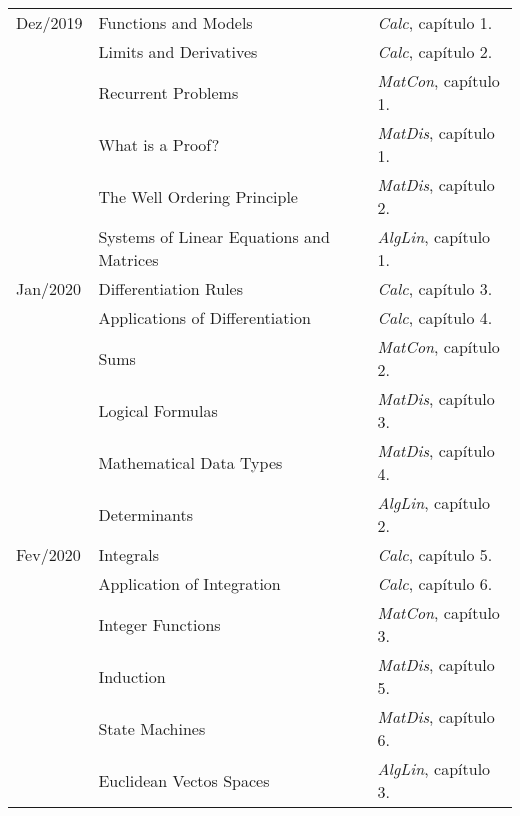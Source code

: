 \documentclass[a4paper]{inzane_syllabus} %
\begin{document}
\begin{center}
\begin{tabularx}{\textwidth}{p{2cm}p{8cm}p{9.5cm}}  
\arrayrulecolor{myCOLOR}\hline
\multicolumn{3}{l}{\textbf{\textcolor{myCOLOR}{\large MÓDULO 1: Base Matemática }}} \\
\hline
Dez/2019 & Functions and Models                      & \emph{Calc},   capítulo 1. \\
         & Limits and Derivatives                    & \emph{Calc},   capítulo 2. \\
         & Recurrent Problems                        & \emph{MatCon}, capítulo 1. \\
         & What is a Proof?                          & \emph{MatDis}, capítulo 1. \\
         & The Well Ordering Principle               & \emph{MatDis}, capítulo 2. \\
         & Systems of Linear Equations and Matrices  & \emph{AlgLin}, capítulo 1. \\

\arrayrulecolor{maingray}\hline
Jan/2020 & Differentiation Rules            & \emph{Calc},   capítulo 3. \\
         & Applications of Differentiation  & \emph{Calc},   capítulo 4. \\
         & Sums                             & \emph{MatCon}, capítulo 2. \\
         & Logical Formulas                 & \emph{MatDis}, capítulo 3. \\
         & Mathematical Data Types          & \emph{MatDis}, capítulo 4. \\
         & Determinants                     & \emph{AlgLin}, capítulo 2. \\

\arrayrulecolor{maingray}\hline
Fev/2020 & Integrals                   & \emph{Calc},   capítulo 5. \\
         & Application of Integration  & \emph{Calc},   capítulo 6. \\
         & Integer Functions           & \emph{MatCon}, capítulo 3. \\
         & Induction                   & \emph{MatDis}, capítulo 5. \\
         & State Machines              & \emph{MatDis}, capítulo 6. \\
         & Euclidean Vectos Spaces     & \emph{AlgLin}, capítulo 3. \\


\end{tabularx}
\end{center}
\end{document}
